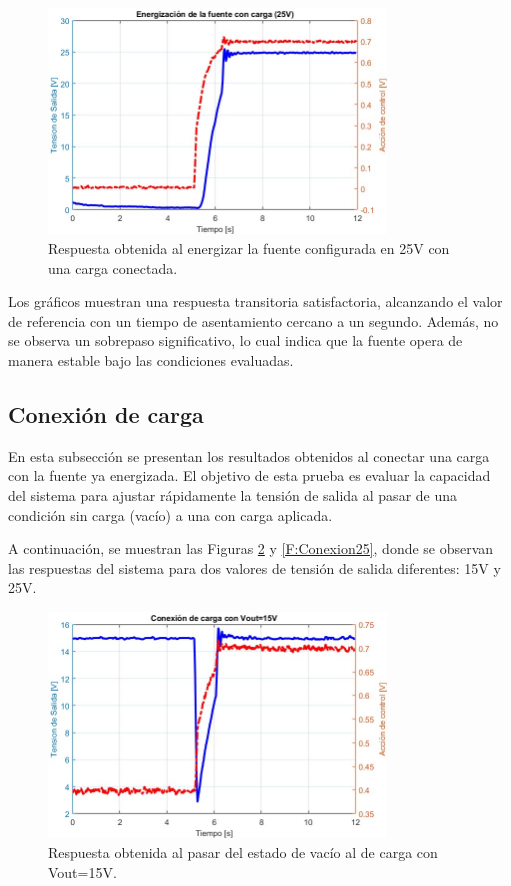 \begin{figure}[htbp]
    \centering
    \includegraphics[width=0.8\textwidth]{./imagenes/Energizacion25.jpg}
    \caption{Respuesta obtenida al energizar la fuente configurada en 25V con una carga conectada.}
    \label{F:Energizacion25}
\end{figure}\par 
Los gráficos muestran una respuesta transitoria satisfactoria, alcanzando el valor de referencia con un tiempo de asentamiento cercano a un segundo. Además, no se observa un sobrepaso significativo, lo cual indica que la fuente opera de manera estable bajo las condiciones evaluadas.\par 

\subsection{Conexión de carga}
En esta subsección se presentan los resultados obtenidos al conectar una carga con la fuente ya energizada.  El objetivo de esta prueba es evaluar la capacidad del sistema para ajustar rápidamente la tensión de salida al pasar de una condición sin carga (vacío) a una con carga aplicada. \par
A continuación, se muestran las Figuras \ref{F:Conexion15} y \ref{F:Conexion25}, donde se observan las respuestas del sistema para dos valores de tensión de salida diferentes: 15V y 25V.\par 

\begin{figure}[htbp]
    \centering
    \includegraphics[width=0.8\textwidth]{./imagenes/Conexion2.jpg}
    \caption{Respuesta obtenida al pasar del estado de vacío al de carga con Vout=15V.}
    \label{F:Conexion15}
\end{figure}\par 

